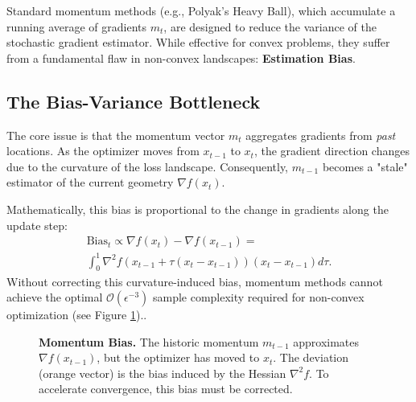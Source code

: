 \documentclass{article}
\theoremstyle{plain}
\theoremstyle{definition}
\theoremstyle{remark}
\begin{document}
Standard momentum methods (e.g., Polyak's Heavy Ball), which accumulate a running average of gradients $m_t$, are designed to reduce the variance of the stochastic gradient estimator. While effective for convex problems, they suffer from a fundamental flaw in non-convex landscapes: \textbf{Estimation Bias}.

\subsection{The Bias-Variance Bottleneck}
The core issue is that the momentum vector $m_t$ aggregates gradients from \textit{past} locations. As the optimizer moves from $x_{t-1}$ to $x_t$, the gradient direction changes due to the curvature of the loss landscape. Consequently, $m_{t-1}$ becomes a "stale" estimator of the current geometry $\nabla f(x_t)$.

Mathematically, this bias is proportional to the change in gradients along the update step:
\begin{multline}
    \text{Bias}_t \propto \nabla f(x_t) - \nabla f(x_{t-1}) =\\ \int_{0}^{1} \nabla^2 f(x_{t-1} + \tau(x_t - x_{t-1})) (x_t - x_{t-1}) d\tau.
\end{multline}
Without correcting this curvature-induced bias, momentum methods cannot achieve the optimal $\mathcal{O}(\epsilon^{-3})$ sample complexity required for non-convex optimization \cite{yuan2016convergence} (see Figure \ref{fig:bias_diagram})..

\begin{figure}[h]
    \centering
    \caption{\textbf{Momentum Bias.} The historic momentum $m_{t-1}$ approximates $\nabla f(x_{t-1})$, but the optimizer has moved to $x_t$. The deviation (orange vector) is the bias induced by the Hessian $\nabla^2 f$. To accelerate convergence, this bias must be corrected.}
    \label{fig:bias_diagram}
\end{figure}
\end{document}
